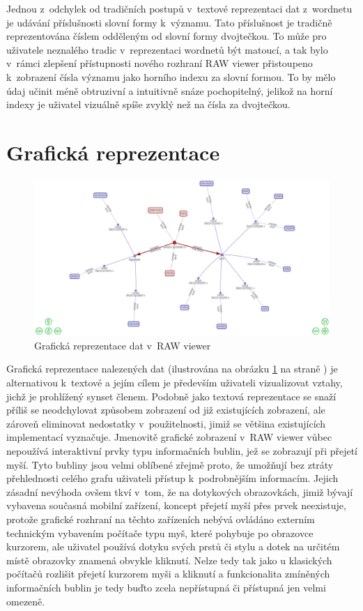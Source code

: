 \documentclass[a4paper,11pt,openany,twoside]{book}
\newcommand{\simplywn}{RAW viewer }
\begin{document}
				Jednou z~odchylek od tradičních postupů v~textové reprezentaci dat z~wordnetu je udávání příslušnosti slovní formy k~významu. Tato příslušnost je tradičně reprezentována číslem odděleným od slovní formy dvojtečkou. To může pro uživatele neznalého tradic v~reprezentaci wordnetů být matoucí, a tak bylo v~rámci zlepšení přístupnosti nového rozhraní \simplywn přistoupeno k~zobrazení čísla významu jako horního indexu za slovní formou. To by mělo údaj učinit méně obtruzivní a intuitivně snáze pochopitelný, jelikož na horní indexy je uživatel  vizuálně spíše zvyklý než na čísla za dvojtečkou.

			\section{Grafická reprezentace}
			\label{cha:graphui}

				\begin{figure}[h]
					\centering
					\includegraphics[width=1.0\textwidth]{simplywn_graph.png}
					\caption{Grafická reprezentace dat v~\simplywn}
					\label{fig:simplywn_graph}
				\end{figure}

				Grafická reprezentace nalezených dat (ilustrována na obrázku \ref{fig:simplywn_graph} na straně \pageref{fig:simplywn_graph}) je alternativou k~textové a jejím cílem je především uživateli vizualizovat vztahy, jichž je prohlížený synset členem. Podobně jako textová reprezentace se snaží příliš se neodchylovat způsobem zobrazení od již existujících zobrazení, ale zároveň eliminovat nedostatky v~použitelnosti, jimiž se většina existujících implementací vyznačuje. Jmenovitě grafické zobrazení v~\simplywn vůbec nepoužívá interaktivní prvky typu informačních bublin, jež se zobrazují při přejetí myší. Tyto bubliny jsou velmi oblíbené zřejmě proto, že umožňují bez ztráty přehlednosti celého grafu uživateli přístup k~podrobnějším informacím. Jejich zásadní nevýhoda ovšem tkví v~tom, že na dotykových obrazovkách, jimiž bývají vybavena současná mobilní zařízení, koncept přejetí myší přes prvek neexistuje, protože grafické rozhraní na těchto zařízeních nebývá ovládáno externím technickým vybavením počítače typu myš, které pohybuje po obrazovce kurzorem, ale uživatel používá dotyku svých prstů či stylu a dotek na určitém místě obrazovky znamená obvykle kliknutí. Nelze tedy tak jako u klasických počítačů rozlišit přejetí kurzorem myši a kliknutí a funkcionalita zmíněných informačních bublin je tedy buďto zcela nepřístupná či přístupná jen velmi omezeně. 
\end{document}
